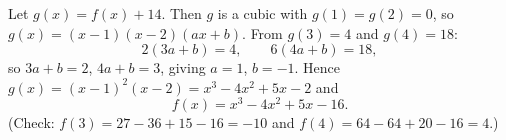 Let $g(x)=f(x)+14$. Then $g$ is a cubic with $g(1)=g(2)=0$, so $g(x)=(x-1)(x-2)(ax+b)$. From $g(3)=4$ and $g(4)=18$:
\[2(3a+b)=4,\qquad6(4a+b)=18,\]
so $3a+b=2$, $4a+b=3$, giving $a=1$, $b=-1$. Hence $g(x)=(x-1)^2(x-2)=x^3-4x^2+5x-2$ and
\[\boxed{f(x)=x^3-4x^2+5x-16}.\]
(Check: $f(3)=27-36+15-16=-10$ and $f(4)=64-64+20-16=4$.)
